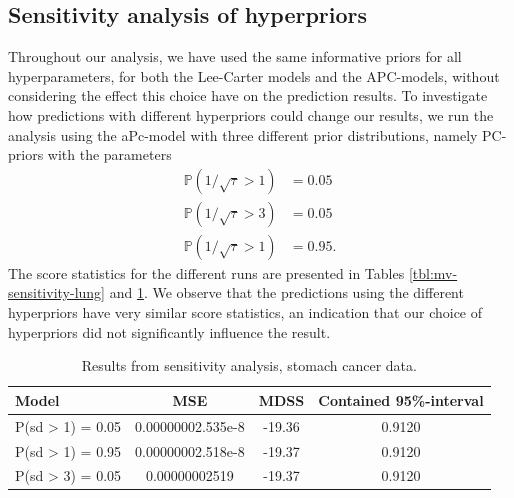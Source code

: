 \newpage
\subsection{Sensitivity analysis of hyperpriors}
Throughout our analysis, we have used the same informative priors for all hyperparameters, for both the Lee-Carter models and the APC-models, without considering the effect this choice have on the prediction results. To investigate how predictions with different hyperpriors could change our results, we run the analysis using the aPc-model with three different prior distributions, namely PC-priors with the parameters
\begin{equation}
    \begin{aligned}
        \mathbb{P}(1/\sqrt{\tau} > 1) & = 0.05 \\
        \mathbb{P}(1/\sqrt{\tau} > 3) & = 0.05 \\
        \mathbb{P}(1/\sqrt{\tau} > 1) & = 0.95.
    \end{aligned}
\end{equation}
The score statistics for the different runs are presented in Tables \ref{tbl:mv-sensitivity-lung} and \ref{tbl:mv-sensitivity-stomach}. We observe that the predictions using the different hyperpriors have very similar score statistics, an indication that our choice of hyperpriors did not significantly influence the result. 


\begin{table}
    \begin{center}
        \begin{tabular}{l |c c c }
        Model & MSE &   MDSS & Contained 95\%-interval\\
        \hline
        P(sd > 1) = 0.05 & 0.00000002.535e-8 & -19.36    & 0.9120\\
        P(sd > 1) = 0.95 & 0.00000002.518e-8 & -19.37    & 0.9120\\
        P(sd > 3) = 0.05 & 0.00000002519 & -19.37    & 0.9120\\
        \end{tabular}
    \caption{Results from sensitivity analysis, stomach cancer data.}\label{tbl:mv-sensitivity-stomach}
    \end{center}
\end{table}

